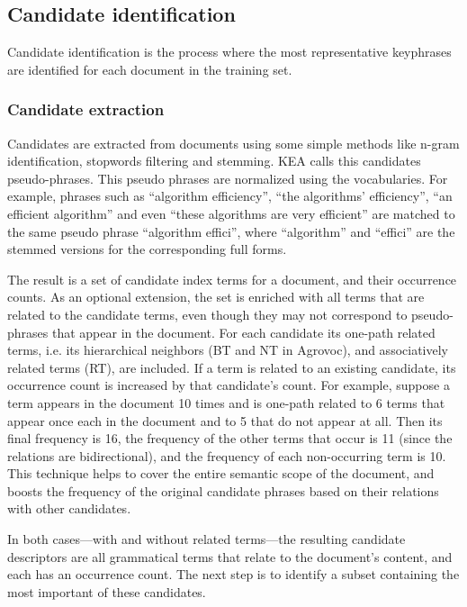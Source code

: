 \subsection{Candidate identification}

Candidate identification is the process where the most representative
keyphrases are identified for each document in the training set.

\subsubsection{Candidate extraction}
Candidates are extracted from documents using some simple methods like
n-gram identification, stopwords filtering and stemming. KEA calls
this candidates pseudo-phrases. This pseudo phrases  are normalized
using the vocabularies. For example, phrases such as “algorithm
efficiency”, “the algorithms’ efficiency”, “an efficient algorithm”
and even “these algorithms are very efficient” are matched to the same
pseudo phrase “algorithm effici”, where “algorithm” and “effici” are
the stemmed versions for the corresponding full forms.

The result is a set of candidate index terms for a document, and their
occurrence counts. As an optional extension, the set is enriched with
all terms that are related to the candidate terms, even though they
may not correspond to pseudo-phrases that appear in the document. For
each candidate its one-path related terms, i.e. its hierarchical
neighbors (BT and NT in Agrovoc), and associatively related terms
(RT), are included. If a term is related to an existing candidate, its
occurrence count is increased by that candidate’s count. For example,
suppose a term appears in the document 10 times and is one-path
related to 6 terms that appear once each in the document and to 5 that
do not appear at all. Then its final frequency is 16, the frequency of
the other terms that occur is 11 (since the relations are
bidirectional), and the frequency of each non-occurring term is 10.
This technique helps to cover the entire semantic scope of the
document, and boosts the frequency of the original candidate phrases
based on their relations with other candidates.

In both cases—with and without related terms—the resulting candidate
descriptors are all grammatical terms that relate to the document’s
content, and each has an occurrence count. The next step is to
identify a subset containing the most important of these candidates.

